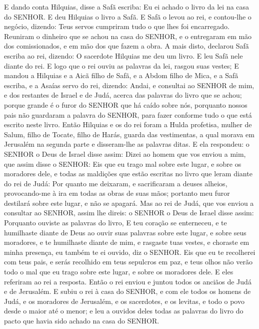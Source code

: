 {E dando conta Hilquias, disse a Safã escriba: Eu ei achado o livro da lei na casa do SENHOR. E deu Hilquias o livro a Safã.
E Safã o levou ao rei, e contou-lhe o negócio, dizendo: Teus servos cumpriram tudo o que lhes foi encarregado.
Reuniram o dinheiro que se achou na casa do SENHOR, e o entregaram em mão dos comissionados, e em mão dos que fazem a obra.
A mais disto, declarou Safã escriba ao rei, dizendo: O sacerdote Hilquias me deu um livro. E leu Safã nele diante do rei.
E logo que o rei ouviu as palavras da lei, rasgou suas vestes;
E mandou a Hilquias e a Aicã filho de Safã, e a Abdom filho de Mica, e a Safã escriba, e a Asaías servo do rei, dizendo:
Andai, e consultai ao SENHOR de mim, e dos restantes de Israel e de Judá, acerca das palavras do livro que se achou; porque grande é o furor do SENHOR que há caído sobre nós, porquanto nossos pais não guardaram a palavra do SENHOR, para fazer conforme tudo o que está escrito neste livro.
Então Hilquias e os do rei foram a Hulda profetisa, mulher de Salum, filho de Tocate, filho de Harás, guarda das vestimentas, a qual morava em Jerusalém na segunda parte
{} e disseram-lhe as palavras ditas.
E ela respondeu: o SENHOR o Deus de Israel disse assim: Dizei ao homem que vos enviou a mim, que assim disse o SENHOR:
Eis que eu trago mal sobre este lugar, e sobre os moradores dele, e todas as maldições que estão escritas no livro que leram diante do rei de Judá:
Por quanto me deixaram, e sacrificaram a deuses alheios, provocando-me à ira em todas as obras de suas mãos; portanto meu furor destilará sobre este lugar, e não se apagará.
Mas ao rei de Judá, que vos enviou a consultar ao SENHOR, assim lhe direis: o SENHOR o Deus de Israel disse assim: Porquanto ouviste as palavras do livro,
E teu coração se enterneceu, e te humilhaste diante de Deus ao ouvir suas palavras sobre este lugar, e sobre seus moradores, e te humilhaste diante de mim, e rasgaste tuas vestes, e choraste em minha presença, eu também te ei ouvido, diz o SENHOR.
Eis que eu te recolherei com teus pais, e serás recolhido em teus sepulcros em paz, e teus olhos não verão todo o mal que eu trago sobre este lugar, e sobre os moradores dele. E eles referiram ao rei a resposta.
Então o rei enviou e juntou todos os anciãos de Judá e de Jerusalém.
E subiu o rei à casa do SENHOR, e com ele todos os homens de Judá, e os moradores de Jerusalém, e os sacerdotes, e os levitas, e todo o povo desde o maior até o menor; e leu a ouvidos deles todas as palavras do livro do pacto que havia sido achado na casa do SENHOR.
}
